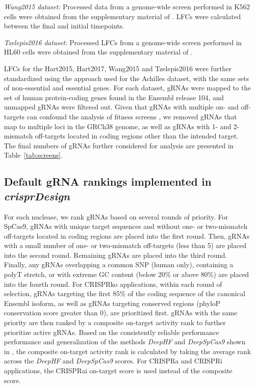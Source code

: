 \documentclass[pdftex,english,10pt]{article}
\begin{document}
{ \textit{Wang2015 dataset:} Processed data from a genome-wide screen performed in K562 cells were obtained from the supplementary material of \citet{sabatini}. LFCs were calculated between the final and initial timepoints. 

\textit{Tzelepis2016 dataset:} Processed LFCs from a genome-wide screen performed in HL60 cells were obtained from the supplementary material of \citet{yusa}. 

LFCs for the Hart2015, Hart2017, Wang2015 and Tzelepis2016 were further standardized using the approach used for the Achilles dataset, with the same sets of non-essential and essential genes. For each dataset, gRNAs were mapped to the set of human protein-coding genes found in the Ensembl release 104, and unmapped gRNAs were filtered out. Given that gRNAs with multiple on- and off-targets can confound the analysis of fitness screens \citep{fortin2019}, we removed gRNAs that map to multiple loci in the GRCh38 genome, as well as gRNAs with 1- and 2-mismatch off-targets located in coding regions other than the intended target. The final numbers of gRNAs further considered for analysis are presented in Table~\ref{tab:screens}.







\subsection*{Default gRNA rankings implemented in \textit{crisprDesign}}

For each nuclease, we rank gRNAs based on several rounds of priority. For SpCas9, gRNAs with unique target sequences and without one- or two-mismatch off-targets located in coding regions are placed into the first round. Then, gRNAs with a small number of one- or two-mismatch off-targets (less than 5) are placed into the second round. Remaining gRNAs are placed into the third round. Finally, any gRNAs overlapping a common SNP (human only), containing a polyT stretch, or with extreme GC content (below 20\% or above 80\%) are placed into the fourth round. For CRISPRko applications, within each round of selection, gRNAs targeting the first 85\% of the coding sequence of the canonical Ensembl isoform, as well as gRNAs targeting conserved regions (phyloP conservation score greater than 0), are prioritized first. gRNAs with the same priority are then ranked by a composite on-target activity rank to further prioritize active gRNAs. Based on the consistently reliable performance performance and generalization of the methods \textit{DeepHF} and \textit{DeepSpCas9} shown in \citet{konstantakos2022crispr,deepcas9,deepspcas9}, 
the composite on-target activity rank is calculated by taking the average rank across the \textit{DeepHF} and \textit{DeepSpCas9} scores. For CRISPRa and CRISPRi applications, the CRISPRai on-target score is used instead of the composite score. 

}
\end{document}
